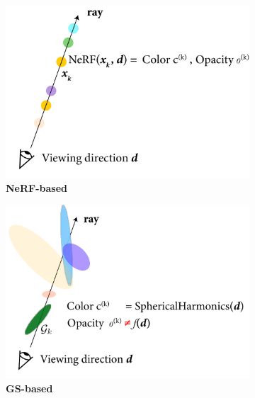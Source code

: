 \begin{figure}[htpb!]
  \centering
  \begin{subfigure}[b]{0.31\linewidth}
    \includegraphics[width=\linewidth]{images/gaussiansplatting/nerf_NEW.png}
    \caption{\textbf{NeRF-based}}
    \label{fig:nerf-ray}
  \end{subfigure}
  \quad %
  \begin{subfigure}[b]{0.31\linewidth}
    \includegraphics[width=\linewidth]{images/gaussiansplatting/gs_vanilla_NEW.png}
    \caption{\textbf{GS-based}}
    \label{fig:gs-ray}
  \end{subfigure}
  \quad %
  \begin{subfigure}[b]{0.31\linewidth}

\end{subfigure}
\end{figure}
